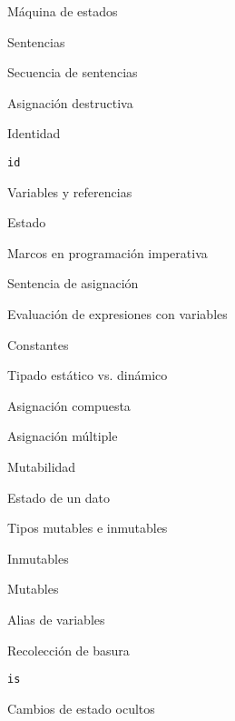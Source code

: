 \begin{longenum}
\begin{longenum}
        \begin{longenum}
            \item Máquina de estados
            \item Sentencias
            \item Secuencia de sentencias
        \end{longenum}
        \item Asignación destructiva
        \begin{longenum}
            \item Identidad
            \begin{longenum}
                \item \texttt{id}
            \end{longenum}
            \item Variables y referencias
            \item Estado
            \item Marcos en programación imperativa
            \item Sentencia de asignación
            \item Evaluación de expresiones con variables
            \item Constantes
            \item Tipado estático vs. dinámico
            \item Asignación compuesta
            \item Asignación múltiple
        \end{longenum}
        \item Mutabilidad
        \begin{longenum}
            \item Estado de un dato
            \item Tipos mutables e inmutables
            \begin{longenum}
                \item Inmutables
                \item Mutables
            \end{longenum}
            \item Alias de variables
            \begin{longenum}
                \item Recolección de basura
                \item \texttt{is}
            \end{longenum}
        \end{longenum}
        \item Cambios de estado ocultos

\end{longenum}
\end{longenum}
